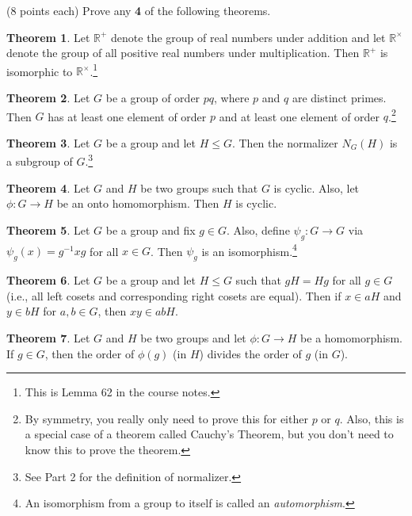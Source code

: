 \documentclass[11pt]{article}
\theoremstyle{definition}
\newtheorem{theorem}{Theorem}
\begin{document}
(8 points each) Prove any \textbf{4} of the following theorems.

\begin{theorem}
Let $\mathbb{R}^+$ denote the group of real numbers under addition and let $\mathbb{R}^{\times}$ denote the group of all positive real numbers under multiplication.  Then $\mathbb{R}^+$ is isomorphic to $\mathbb{R}^{\times}$.\footnote{This is Lemma 62 in the course notes.}
\end{theorem}

\begin{theorem}
Let $G$ be a group of order $pq$, where $p$ and $q$ are distinct primes.  Then $G$ has at least one element of order $p$ and at least one element of order $q$.\footnote{By symmetry, you really only need to prove this for either $p$ or $q$. Also, this is a special case of a theorem called Cauchy's Theorem, but you don't need to know this to prove the theorem.}
\end{theorem}

\begin{theorem}
Let $G$ be a group and let $H\leq G$.  Then the normalizer $N_G(H)$ is a subgroup of $G$.\footnote{See Part 2 for the definition of normalizer.}
\end{theorem}

\begin{theorem}
Let $G$ and $H$ be two groups such that $G$ is cyclic. Also, let $\phi:G\to H$ be an onto homomorphism.  Then $H$ is cyclic.
\end{theorem}

\begin{theorem}
Let $G$ be a group and fix $g\in G$. Also, define $\psi_g: G\to G$ via $\psi_g(x)=g^{-1}xg$ for all $x\in G$.  Then $\psi_g$ is an isomorphism.\footnote{An isomorphism from a group to itself is called an \emph{automorphism}.}
\end{theorem}

\begin{theorem}
Let $G$ be a group and let $H\leq G$ such that $gH=Hg$ for all $g\in G$ (i.e., all left cosets and corresponding right cosets are equal).  Then if $x\in aH$ and $y\in bH$ for $a,b\in G$, then $xy\in abH$.
\end{theorem}

\begin{theorem}
Let $G$ and $H$ be two groups and let $\phi:G\to H$ be a homomorphism.  If $g\in G$, then the order of $\phi(g)$ (in $H$) divides the order of $g$ (in $G$). 
\end{theorem}
\end{document}
